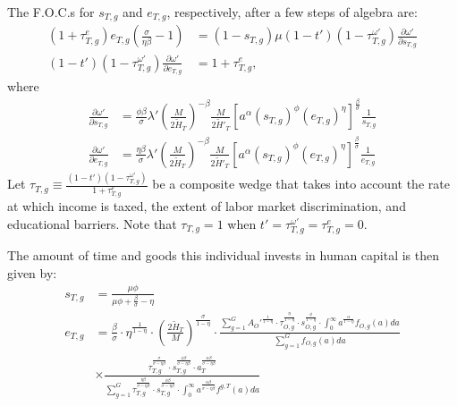 \documentclass[onehalfspacing,11pt]{article}
\begin{document}
The F.O.C.s for $s_{T,g}$ and $e_{T,g}$, respectively, after a few steps of algebra are:
\begin{align}
\label{eq:foc-e}
(1+\tau^e_{T,g}) e_{T,g} \left( \frac{\sigma}{\eta\beta }-1 \right) & = \left(1-s_{T,g}\right) \mu(1-t')(1-\tau^{\omega '}_{T,g}) \frac{\partial \omega'}{\partial s_{T,g}} \\
\label{eq:foc-s}
(1-t')(1-\tau^{\omega '}_{T,g}) \frac{\partial \omega'}{\partial e_{T,g}} & = 1+\tau^e_{T,g},
\end{align}
where
\begin{align}
 \frac{\partial \omega'}{\partial s_{T,g}} & =  \frac{\phi\beta }{\sigma} \lambda' \left(\frac{M}{2 \widetilde{H}_T}\right)^{-\beta} \frac{M}{2 {\widetilde{H}'_T}} \left[ a^\alpha (s_{T,g})^\phi (e_{T,g})^\eta \right]^{\frac{\beta}{\sigma}} \frac{1}{s_{T,g}} \label{eq:sT} \\
 \frac{\partial \omega'}{\partial e_{T,g}} & = \frac{\eta\beta }{\sigma} \lambda' \left(\frac{M}{2 \widetilde{H}_T}\right)^{-\beta} \frac{M}{2 {\widetilde{H}'_T}} \left[ a^\alpha (s_{T,g})^\phi (e_{T,g})^\eta \right]^{\frac{\beta}{\sigma}} \frac{1}{e_{T,g}} \label{eq:eT}
\end{align}
Let $\tau_{T,g} \equiv \frac{\left( 1-t' \right) \left( 1-\tau^{\omega '}_{T,g} \right)}{1+\tau^e_{T,g}}$ be a composite wedge that takes into account the rate at which income is taxed, the extent of labor market discrimination, and educational barriers. Note that $\tau_{T,g}=1$ when $t' = \tau^{\omega '}_{T,g} = \tau^e_{T,g} = 0$.

The amount of time and goods this individual invests in human capital is then given by:
\begin{align}
s_{T,g} & = \frac{\mu \phi}{\mu \phi+\tfrac{\beta}{\sigma}-\eta} \\
e_{T,g} & = \tfrac{\beta}{\sigma}\cdot\eta^{\frac{1}{1-\eta}}\cdot \left(\tfrac{2\widetilde{H}_T}{M}\right)^{\frac{\sigma}{1-\eta}} \cdot \frac{\sum_{g=1}^G {A_O'}^\frac{1}{1-\eta}\cdot\tau_{O,g}^\frac{\eta}{1-\eta} \cdot s_{O,g}^\frac{\phi}{1-\eta}\cdot \int_0^\infty a^{\frac{\alpha}{1-\eta}} f_{O,g}(a)da}{\sum_{g=1}^G f_{O,g}(a)da} \nonumber\\
& \times \frac{\tau_{T,g}^\frac{\sigma}{\sigma-\eta\beta } \cdot s_{T,g}^\frac{\phi\beta }{\sigma-\eta\beta } \cdot a_T^\frac{\alpha\beta }{\sigma-\eta\beta}}{\sum_{g=1}^G \tau_{T,g}^\frac{\eta\beta }{\sigma-\eta\beta } \cdot s_{T,g}^\frac{\phi\beta }{\sigma-\eta\beta } \cdot \int_0^\infty a^\frac{\alpha\beta}{\sigma-\eta\beta } f^{g,T}(a)da}
\end{align}
\end{document}
